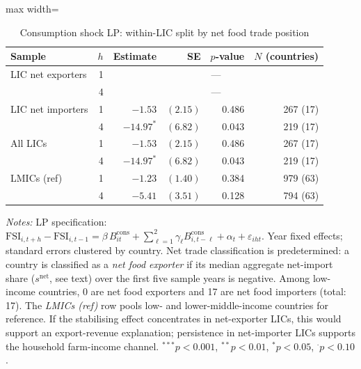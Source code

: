 
\begin{table}[htbp]
\centering
\caption{Consumption shock LP: within-LIC split by net food trade position}
\label{tab:lic-nettrade}
\begin{adjustbox}{max width=\textwidth}
\begin{threeparttable}\small
\begin{tabular}{l r rrrr}
\toprule
Sample & $h$ & Estimate & SE & $p$-value & $N$ (countries) \\
\midrule
LIC net exporters & 1 & \multicolumn{4}{c}{---} \\
 & 4 & \multicolumn{4}{c}{---} \\
\addlinespace
LIC net importers & 1 & $-1.53$ & $(2.15)$ & 0.486 & 267 (17) \\
 & 4 & $-14.97^{*}$ & $(6.82)$ & 0.043 & 219 (17) \\
\addlinespace
All LICs & 1 & $-1.53$ & $(2.15)$ & 0.486 & 267 (17) \\
 & 4 & $-14.97^{*}$ & $(6.82)$ & 0.043 & 219 (17) \\
\addlinespace
LMICs (ref) & 1 & $-1.23$ & $(1.40)$ & 0.384 & 979 (63) \\
 & 4 & $-5.41$ & $(3.51)$ & 0.128 & 794 (63) \\
\bottomrule
\end{tabular}
\begin{tablenotes}\small
\item \textit{Notes:} LP specification: $\text{FSI}_{i,t+h} - \text{FSI}_{i,t-1} = \beta\,B^{\text{cons}}_{it} + \sum_{\ell=1}^{2}\gamma_\ell B^{\text{cons}}_{i,t-\ell} + \alpha_t + \varepsilon_{iht}$. Year fixed effects; standard errors clustered by country. Net trade classification is predetermined: a country is classified as a \textit{net food exporter} if its median aggregate net-import share ($s^{\text{net}}$, see text) over the first five sample years is negative. Among low-income countries, 0 are net food exporters and 17 are net food importers (total: 17). The \textit{LMICs (ref)} row pools low- and lower-middle-income countries for reference. If the stabilising effect concentrates in net-exporter LICs, this would support an export-revenue explanation; persistence in net-importer LICs supports the household farm-income channel. $^{***}p<0.001$, $^{**}p<0.01$, $^{*}p<0.05$, $^{\cdot}p<0.10$.
\end{tablenotes}
\end{threeparttable}
\end{adjustbox}
\end{table}
